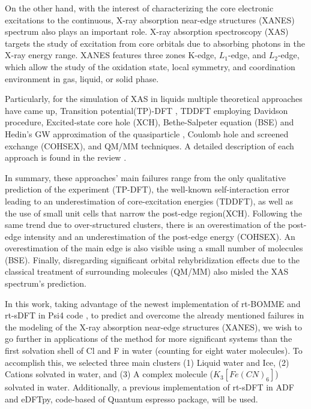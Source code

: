 \documentclass[notitlepage,12pt]{report}
\begin{document}
	On the other hand, with the interest of characterizing the core electronic excitations to the continuous, X-ray absorption near-edge structures (XANES) spectrum also plays an important role. X-ray absorption spectroscopy (XAS) targets the study of excitation from core orbitals due to absorbing photons in the X-ray energy range\supercite{fransson2016x}. XANES features three zones K-edge, $L_1$-edge, and $L_2$-edge, which allow the study of the oxidation state, local symmetry, and coordination environment in gas, liquid, or solid phase\supercite{rehr2005progress,koningsberger1987x}. 
	
	Particularly, for the simulation of XAS in liquids multiple theoretical approaches have came up, Transition potential(TP)-DFT \supercite{triguero1998calculations}, TDDFT employing Davidson procedure\supercite{davidson197514}, Excited-state core hole (XCH)\supercite{prendergast2006x}, Bethe-Salpeter equation (BSE) and Hedin’s GW approximation of the quasiparticle \supercite{vinson2012theoretical}, Coulomb hole and screened exchange (COHSEX)\supercite{chen2010x}, and QM/MM techniques\supercite{list2014lanczos}. A detailed description of each approach is found in the review \cite{fransson2016x}. 
	
	In summary, these approaches’ main failures range from the only qualitative prediction of the experiment (TP-DFT), the well-known self-interaction error leading to an underestimation of core-excitation energies (TDDFT), as well as the use of small unit cells that narrow the post-edge region(XCH). Following the same trend due to over-structured clusters, there is an overestimation of the post-edge intensity and an underestimation of the post-edge energy (COHSEX). An overestimation of the main edge is also visible using a small number of molecules (BSE). Finally, disregarding significant orbital rehybridization effects due to the classical treatment of surrounding molecules (QM/MM) also misled the XAS spectrum’s prediction.
	
	In this work, taking advantage of the newest implementation of rt-BOMME and rt-sDFT \supercite{de2021environment} in Psi4 code \supercite{smith2020psi4}, to predict and overcome the already mentioned failures in the modeling of the X-ray absorption near-edge structures (XANES), we wish to go further in applications of the method for more significant systems than the first solvation shell of Cl and F in water (counting for eight water molecules). To accomplish this, we selected three main clusters (1) Liquid water and Ice, (2) Cations solvated in water, and (3) A complex molecule ($K_3[Fe(CN)_6]$) solvated in water. Additionally, a previous implementation of rt-sDFT in ADF\supercite{te2001chemistry} and eDFTpy\supercite{edftpy}, code-based of Quantum espresso package\supercite{giannozzi2009quantum}, will be used.
\end{document}
